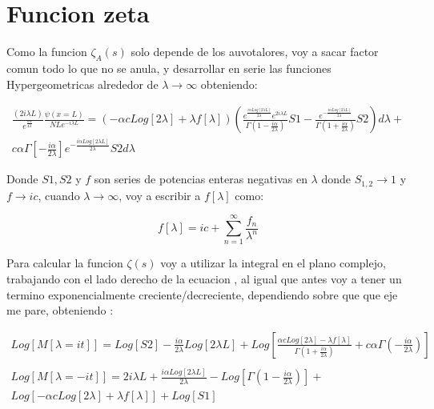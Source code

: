 \section{Funcion zeta}

Como la funcion $\zeta _A (s) $ solo depende de los auvotalores, voy a sacar factor comun todo lo que no se anula, y desarrollar en serie las funciones Hypergeometricas alrededor de $\lambda \rightarrow \infty$ obteniendo:

\begin{equation}
\begin{array}{c}
\frac{(2 i \lambda L)}
{e ^{ \frac{\pi \alpha}{4 \lambda}}}
 \frac{\psi (x=L)}{N L e ^{-i \lambda L} } = 
 (- \alpha c Log[2 \lambda] + \lambda f[ \lambda ] ) 
 \left(
 \frac{e ^{  \frac{i \alpha Log[2 \lambda L ]}{2 \lambda } } e ^{2 i \lambda L } }
 {\Gamma ( 1 - \frac{i \alpha}{2 \lambda} )} S1 - 
 \frac{e ^{ -  \frac{i \alpha Log[2 \lambda L ]}{2 \lambda } } }
 	  {\Gamma (1 + \frac{i \alpha}{2 \lambda})} S2 
 \right) d \lambda + \\
 c \alpha \Gamma \left[ -\frac{i \alpha}{2 \lambda} \right]
 e ^{- \frac{i \alpha Log[2 \lambda L]}{2 \lambda}} S2 d \lambda
\end{array}
\end{equation}

Donde $S1,S2$ y $f$ son series de potencias enteras negativas en $\lambda$ donde $S _{1,2} \rightarrow 1$ y $f \rightarrow i c$, cuando $\lambda \rightarrow \infty$, voy a escribir a $f[\lambda]$ como:

\begin{equation}
f[\lambda] = i c + \sum _{n=1} ^{\infty} \frac{f _n}{\lambda ^n}
\end{equation}



Para calcular la funcion $\zeta (s) $ voy a utilizar la integral en el plano complejo, trabajando con el lado derecho de la ecuacion , al igual que antes voy a tener un termino exponencialmente creciente/decreciente, dependiendo sobre que que eje me pare, obteniendo : 

\begin{equation}
\begin{array}{c}
Log[M[\lambda = i t]] = 
Log[S2] - 
\frac{i \alpha}{2 \lambda} Log[2 \lambda L] + %
Log[
	\frac{\alpha c Log[2 \lambda] - \lambda f[\lambda] }{\Gamma (1 + \frac{i \alpha}{ 2 \lambda})} + 
	c \alpha \Gamma \left(- \frac{i \alpha}{2 \lambda} \right) ] \\ \\
	
Log[M[\lambda = - i t]] = 
2 i \lambda L +
\frac{i \alpha Log[2 \lambda L]}{2 \lambda} -
Log[\Gamma (1- \frac{i \alpha}{2 \lambda}) ] + \\
Log[
	- \alpha c Log[2 \lambda] +
	\lambda f[\lambda]
	] +
Log[S1]
\end{array}
\end{equation}


